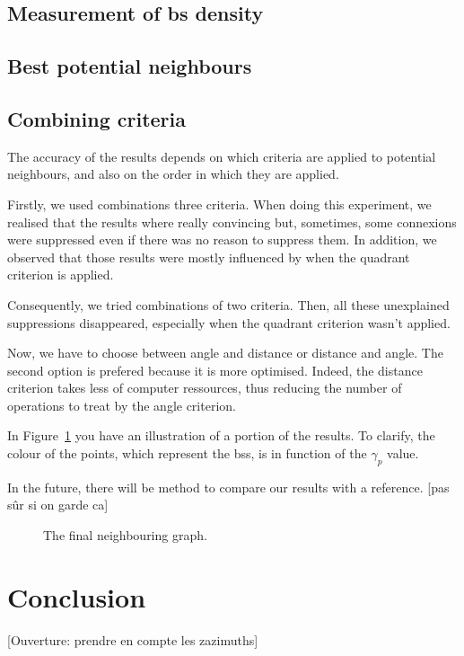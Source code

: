 \documentclass[lettersize,journal,english]{IEEEtran}
\begin{document}
    \subsection{Measurement of \acrshort{bs} density}

    \subsection{Best potential neighbours}
        
    \subsection{Combining criteria}
        The accuracy of the results depends on which criteria are applied to potential neighbours, and also on the order in which they are applied.

        Firstly, we used combinations three criteria. When doing this experiment, we realised that the results where really convincing but, sometimes, some connexions were suppressed even if there was no reason to suppress them. In addition, we observed that those results were mostly influenced by when the quadrant criterion is applied.

        Consequently, we tried combinations of two criteria. Then, all these unexplained suppressions disappeared, especially when the quadrant criterion wasn't applied.

        Now, we have to choose between angle and distance or distance and angle. The second option is prefered because it is more optimised. Indeed, the distance criterion takes less of computer ressources, thus reducing the number of operations to treat by the angle criterion.

        In Figure~\ref{fig:final_neighs} you have an illustration of a portion of the results. To clarify, the colour of the points, which represent the \acrshort{bs}s, is in function of the $\gamma_p$ value.

        In the future, there will be method to compare our results with a reference. [pas sûr si on garde ca]
        \begin{figure}
            \centering
            \caption{The final neighbouring graph.}
            \label{fig:final_neighs}
        \end{figure}

\section{Conclusion\label{sec:ccl}}
    [Ouverture: prendre en compte les zazimuths]

\printglossary[type=\acronymtype]
\printglossary



\end{document}
